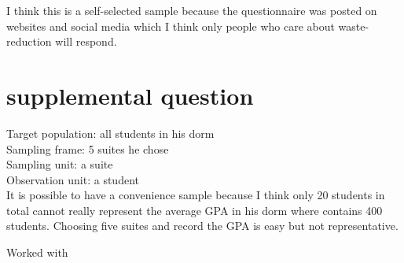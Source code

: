\documentclass{article}
\begin{document}
I think this is a self-selected sample because the questionnaire was posted on websites and social media which I think only people who care about waste-reduction will respond.

\section*{supplemental question}
Target population: all students in his dorm\\
Sampling frame: 5 suites he chose\\
Sampling unit: a suite\\
Observation unit: a student\\

It is possible to have a convenience sample because I think only 20 students in total cannot really represent the average GPA in his dorm where contains 400 students. Choosing five suites and record the GPA is easy but not representative.     


Worked with 
\end{document}
